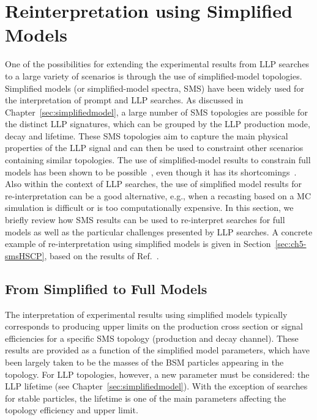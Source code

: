 \section{Reinterpretation using Simplified Models}
\label{sec:ch5-smsReinterpretations}

One of the possibilities for extending the experimental results from LLP
searches to a large variety of scenarios is through the use of simplified-model topologies.
Simplified models (or simplified-model spectra, SMS) have been widely used for the interpretation of
prompt and LLP searches. As discussed in Chapter~\ref{sec:simplifiedmodel}, a large
number of SMS topologies are possible for the distinct LLP signatures, which
can be grouped by the LLP production mode, decay and lifetime.
These SMS topologies aim to capture the main physical properties of the LLP
signal and can then be used to constraint other scenarios containing similar
topologies.
The use of simplified-model results to constrain full models has been
shown to be possible~\cite{Kraml:2013mwa,Papucci:2014rja,Belanger:2015cra,Barducci:2015zna,Arina:2015uea,Ambrogi:2017lov}, 
even though it has its shortcomings~\cite{Ambrogi:2017lov}.
Also within the context of LLP searches, the use of
simplified model results for re-interpretation can be a good alternative, e.g.,
when a recasting based on a MC simulation is difficult or
is too computationally expensive.
In this section, we briefly review how 
SMS results can be used to re-interpret searches for full
models as well as the particular challenges presented by LLP searches.
A concrete example of re-interpretation using simplified models is given in
Section~\ref{sec:ch5-smsHSCP}, based on the results of Ref.~\cite{Heisig:2015yla}.

\subsection{From Simplified to Full Models}

The interpretation of experimental results using
simplified models typically corresponds to producing upper limits on the production
cross section or signal efficiencies for a specific SMS topology (production and
decay channel). These results are provided as a function of the simplified model
parameters, which have been largely taken to be the masses of the BSM
particles appearing in the topology. For LLP topologies, however, 
a new parameter must be considered: the LLP lifetime (see Chapter~\ref{sec:simplifiedmodel}).
With the exception of searches for stable particles, the lifetime is one of the
main parameters affecting the topology efficiency and upper limit.

